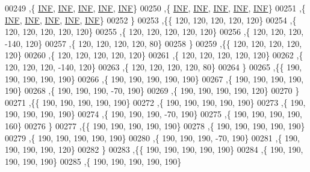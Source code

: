 \begin{DoxyCode}
00249   ,\{   \mbox{\hyperlink{1_88_84__epars_8h_a12c2040f25d8e3a7b9e1c2024c618cb6}{INF}},   \mbox{\hyperlink{1_88_84__epars_8h_a12c2040f25d8e3a7b9e1c2024c618cb6}{INF}},   \mbox{\hyperlink{1_88_84__epars_8h_a12c2040f25d8e3a7b9e1c2024c618cb6}{INF}},   \mbox{\hyperlink{1_88_84__epars_8h_a12c2040f25d8e3a7b9e1c2024c618cb6}{INF}},   \mbox{\hyperlink{1_88_84__epars_8h_a12c2040f25d8e3a7b9e1c2024c618cb6}{INF}}\}
00250   ,\{   \mbox{\hyperlink{1_88_84__epars_8h_a12c2040f25d8e3a7b9e1c2024c618cb6}{INF}},   \mbox{\hyperlink{1_88_84__epars_8h_a12c2040f25d8e3a7b9e1c2024c618cb6}{INF}},   \mbox{\hyperlink{1_88_84__epars_8h_a12c2040f25d8e3a7b9e1c2024c618cb6}{INF}},   \mbox{\hyperlink{1_88_84__epars_8h_a12c2040f25d8e3a7b9e1c2024c618cb6}{INF}},   \mbox{\hyperlink{1_88_84__epars_8h_a12c2040f25d8e3a7b9e1c2024c618cb6}{INF}}\}
00251   ,\{   \mbox{\hyperlink{1_88_84__epars_8h_a12c2040f25d8e3a7b9e1c2024c618cb6}{INF}},   \mbox{\hyperlink{1_88_84__epars_8h_a12c2040f25d8e3a7b9e1c2024c618cb6}{INF}},   \mbox{\hyperlink{1_88_84__epars_8h_a12c2040f25d8e3a7b9e1c2024c618cb6}{INF}},   \mbox{\hyperlink{1_88_84__epars_8h_a12c2040f25d8e3a7b9e1c2024c618cb6}{INF}},   \mbox{\hyperlink{1_88_84__epars_8h_a12c2040f25d8e3a7b9e1c2024c618cb6}{INF}}\}
00252   \}
00253  ,\{\{   120,   120,   120,   120,   120\}
00254   ,\{   120,   120,   120,   120,   120\}
00255   ,\{   120,   120,   120,   120,   120\}
00256   ,\{   120,   120,   120,  -140,   120\}
00257   ,\{   120,   120,   120,   120,    80\}
00258   \}
00259  ,\{\{   120,   120,   120,   120,   120\}
00260   ,\{   120,   120,   120,   120,   120\}
00261   ,\{   120,   120,   120,   120,   120\}
00262   ,\{   120,   120,   120,  -140,   120\}
00263   ,\{   120,   120,   120,   120,    80\}
00264   \}
00265  ,\{\{   190,   190,   190,   190,   190\}
00266   ,\{   190,   190,   190,   190,   190\}
00267   ,\{   190,   190,   190,   190,   190\}
00268   ,\{   190,   190,   190,   -70,   190\}
00269   ,\{   190,   190,   190,   190,   120\}
00270   \}
00271  ,\{\{   190,   190,   190,   190,   190\}
00272   ,\{   190,   190,   190,   190,   190\}
00273   ,\{   190,   190,   190,   190,   190\}
00274   ,\{   190,   190,   190,   -70,   190\}
00275   ,\{   190,   190,   190,   190,   160\}
00276   \}
00277  ,\{\{   190,   190,   190,   190,   190\}
00278   ,\{   190,   190,   190,   190,   190\}
00279   ,\{   190,   190,   190,   190,   190\}
00280   ,\{   190,   190,   190,   -70,   190\}
00281   ,\{   190,   190,   190,   190,   120\}
00282   \}
00283  ,\{\{   190,   190,   190,   190,   190\}
00284   ,\{   190,   190,   190,   190,   190\}
00285   ,\{   190,   190,   190,   190,   190\}

\end{DoxyCode}
